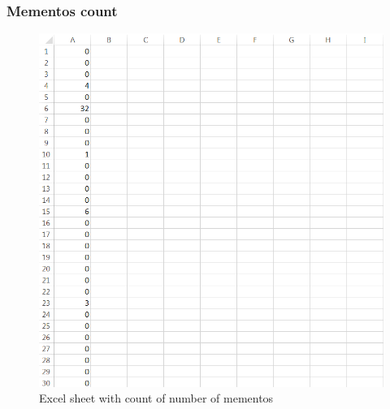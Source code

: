 \subsubsection{Mementos count}
\begin{figure}[ht]    
    \begin{center}
        \includegraphics[scale=0.80]{allmems.png}
        \caption{Excel sheet with count of number of mementos}
        \label{Excel sheet with count of number of mementos}
    \end{center}
\end{figure}
\newpage
